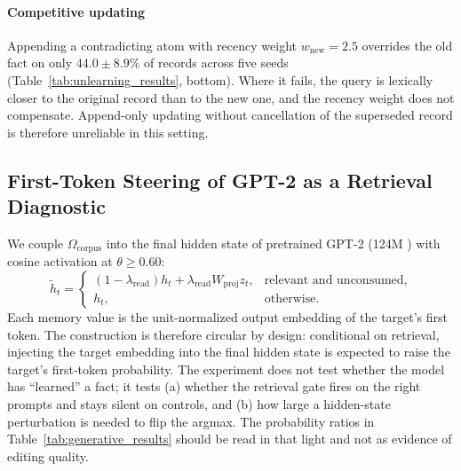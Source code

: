 \documentclass[preprint,12pt]{elsarticle}
\newcommand{\Om}{\Omega}
\providecommand{\DIFaddend}{} %
\DeclareRobustCommand{\DIFaddend}{\DIFOaddend \let\includegraphics\DIFOincludegraphics} %
\begin{document}
\DIFaddend \paragraph{Competitive updating}
Appending a contradicting atom with recency weight $w_{\mathrm{new}} = 2.5$ overrides the old fact on only $44.0\pm8.9\%$ of records across five seeds (Table~\ref{tab:unlearning_results}, bottom). Where it fails, the query is lexically closer to the original record than to the new one, and the recency weight does not compensate. Append-only updating without cancellation of the superseded record is therefore unreliable in this setting.

\subsection{First-Token Steering of GPT-2 as a Retrieval Diagnostic}
\label{sec:generative}

We couple $\Om_{\mathrm{corpus}}$ into the final hidden state of pretrained GPT-2 (124M \cite{radford2019language}) with cosine activation at $\theta \ge 0.60$:
\[
  \tilde{h}_t =
  \begin{cases}
    (1-\lambda_{\mathrm{read}})h_t + \lambda_{\mathrm{read}}W_{\mathrm{proj}}z_t,
      & \text{relevant and unconsumed},\\
    h_t, & \text{otherwise}.
  \end{cases}
\]
Each memory value is the unit-normalized output embedding of the target's first token. The construction is therefore circular by design: conditional on retrieval, injecting the target embedding into the final hidden state is expected to raise the target's first-token probability. The experiment does not test whether the model has ``learned'' a fact; it tests (a) whether the retrieval gate fires on the right prompts and stays silent on controls, and (b) how large a hidden-state perturbation is needed to flip the argmax. The probability ratios in Table~\ref{tab:generative_results} should be read in that light and not as evidence of editing quality.
\end{document}
